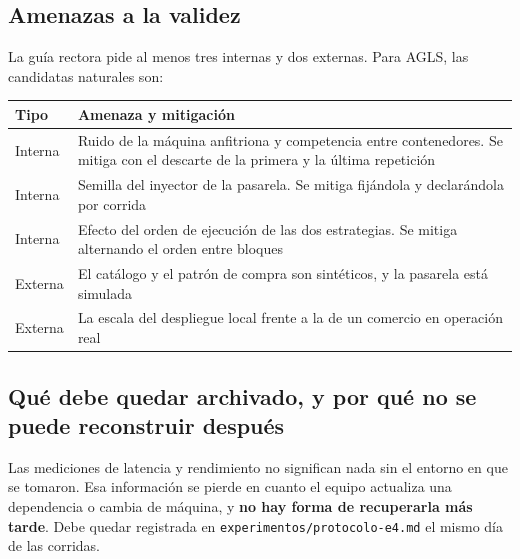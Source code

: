\documentclass[11pt,a4paper]{article}
\begin{document}
\subsection{Amenazas a la validez}

La guía rectora pide al menos tres internas y dos externas. Para AGLS, las candidatas naturales son:

\begin{center}
	\small
	\begin{tabular}{@{}p{2.0cm}p{12.9cm}@{}}
		\toprule
		\textbf{Tipo} & \textbf{Amenaza y mitigación} \\
		\midrule
		Interna & Ruido de la máquina anfitriona y competencia entre contenedores. Se mitiga con el descarte de la primera y la última repetición \\
		Interna & Semilla del inyector de la pasarela. Se mitiga fijándola y declarándola por corrida \\
		Interna & Efecto del orden de ejecución de las dos estrategias. Se mitiga alternando el orden entre bloques \\
		\addlinespace
		Externa & El catálogo y el patrón de compra son sintéticos, y la pasarela está simulada \\
		Externa & La escala del despliegue local frente a la de un comercio en operación real \\
		\bottomrule
	\end{tabular}
\end{center}

\subsection{Qué debe quedar archivado, y por qué no se puede reconstruir después}

Las mediciones de latencia y rendimiento no significan nada sin el entorno en que se tomaron. Esa información se pierde en cuanto el equipo actualiza una dependencia o cambia de máquina, y \textbf{no hay forma de recuperarla más tarde}. Debe quedar registrada en \texttt{experimentos/protocolo-e4.md} el mismo día de las corridas.
\end{document}
